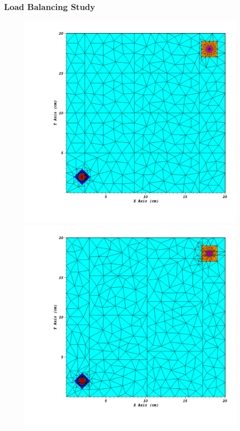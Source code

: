 \documentclass[xcolor={usenames,dvipsnames,svgnames,table}]{beamer}
\begin{document}
\begin{frame}[t]\frametitle{Load Balancing Study}
\begin{figure}[H]
\centering
\includegraphics[scale=0.25,trim={0.95in 0.64in 0.35in 0.44in},clip]{figures/og_lb_example.pdf}
\includegraphics[scale=0.25,trim={0.95in 0.64in 0.35in 0.44in},clip]{figures/lbd_example.pdf}

\end{figure}
\end{frame}
\end{document}
